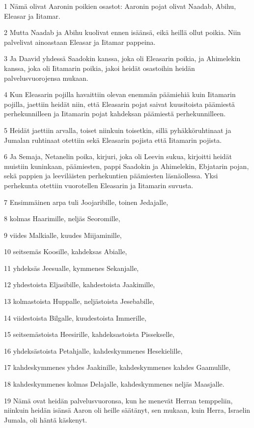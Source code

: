 \par 1 Nämä olivat Aaronin poikien osastot: Aaronin pojat olivat Naadab, Abihu, Eleasar ja Iitamar.
\par 2 Mutta Naadab ja Abihu kuolivat ennen isäänsä, eikä heillä ollut poikia. Niin palvelivat ainoastaan Eleasar ja Iitamar pappeina.
\par 3 Ja Daavid yhdessä Saadokin kanssa, joka oli Eleasarin poikia, ja Ahimelekin kanssa, joka oli Iitamarin poikia, jakoi heidät osastoihin heidän palvelusvuorojensa mukaan.
\par 4 Kun Eleasarin pojilla havaittiin olevan enemmän päämiehiä kuin Iitamarin pojilla, jaettiin heidät niin, että Eleasarin pojat saivat kuusitoista päämiestä perhekunnilleen ja Iitamarin pojat kahdeksan päämiestä perhekunnilleen.
\par 5 Heidät jaettiin arvalla, toiset niinkuin toisetkin, sillä pyhäkköruhtinaat ja Jumalan ruhtinaat otettiin sekä Eleasarin pojista että Iitamarin pojista.
\par 6 Ja Semaja, Netanelin poika, kirjuri, joka oli Leevin sukua, kirjoitti heidät muistiin kuninkaan, päämiesten, pappi Saadokin ja Ahimelekin, Ebjatarin pojan, sekä pappien ja leeviläisten perhekuntien päämiesten läsnäollessa. Yksi perhekunta otettiin vuorotellen Eleasarin ja Iitamarin suvusta.
\par 7 Ensimmäinen arpa tuli Joojaribille, toinen Jedajalle,
\par 8 kolmas Haarimille, neljäs Seoromille,
\par 9 viides Malkialle, kuudes Miijaminille,
\par 10 seitsemäs Koosille, kahdeksas Abialle,
\par 11 yhdeksäs Jeesualle, kymmenes Sekanjalle,
\par 12 yhdestoista Eljasibille, kahdestoista Jaakimille,
\par 13 kolmastoista Huppalle, neljästoista Jesebabille,
\par 14 viidestoista Bilgalle, kuudestoista Immerille,
\par 15 seitsemästoista Heesirille, kahdeksastoista Pissekselle,
\par 16 yhdeksästoista Petahjalle, kahdeskymmenes Hesekielille,
\par 17 kahdeskymmenes yhdes Jaakinille, kahdeskymmenes kahdes Gaamulille,
\par 18 kahdeskymmenes kolmas Delajalle, kahdeskymmenes neljäs Maasjalle.
\par 19 Nämä ovat heidän palvelusvuoronsa, kun he menevät Herran temppeliin, niinkuin heidän isänsä Aaron oli heille säätänyt, sen mukaan, kuin Herra, Israelin Jumala, oli häntä käskenyt.
